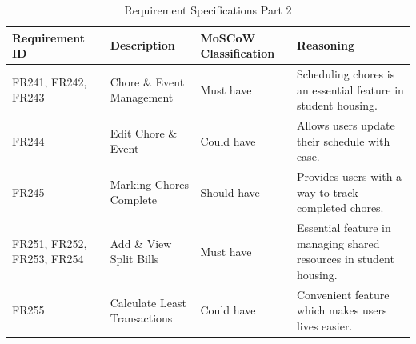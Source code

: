 \documentclass{scrreprt}
\theoremstyle{definition}
\begin{document}
\begin{table}[H]
    \flushleft
    \begin{tabularx}{\textwidth}{|>{\raggedright}X|>{\raggedright}X|>{\raggedright}X|X|}
    \hline
    \textbf{Requirement ID} & \textbf{Description} & \textbf{MoSCoW Classification} & \textbf{Reasoning} \\ \hline
    FR241, FR242, FR243 & Chore \& Event Management & Must have & Scheduling chores is an essential feature in student housing. \\ \hline

    FR244 & Edit Chore \& Event & Could have & Allows users update their schedule with ease. \\ \hline

    FR245 & Marking Chores Complete & Should have & Provides users with a way to track completed chores. \\ \hline

    FR251, FR252, FR253, FR254 & Add \& View Split Bills & Must have & Essential feature in managing shared resources in student housing. \\ \hline

    FR255 & Calculate Least Transactions & Could have & Convenient feature which makes users lives easier. \\ \hline
    \end{tabularx}
    \caption{Requirement Specifications Part 2}
\end{table}
\end{document}
